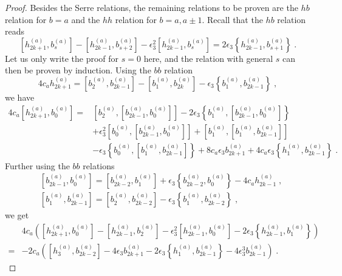 \documentclass[11pt]{article}
\numberwithin{equation}{section}
\numberwithin{figure}{section}
\numberwithin{table}{section}
\begin{document}
\begin{proof}
Besides the Serre relations, the remaining relations to be proven are the $hb$ relation for $b=a$ and the $hh$ relation for $b=a,a\pm1$. Recall that the $hb$ relation reads
\begin{equation}
	\left[h^{(a)}_{2k+1},b^{(a)}_s\right]-\left[h^{(a)}_{2k-1},b^{(a)}_{s+2}\right]-\epsilon_3^2\left[h^{(a)}_{2k-1},b^{(a)}_s\right]=2\epsilon_3\left\{h^{(a)}_{2k-1},b^{(a)}_{s+1}\right\}\;.
\end{equation}
Let us only write the proof for $s=0$ here, and the relation with general $s$ can then be proven by induction. Using the $bb$ relation
\begin{equation}
	4c_ah^{(a)}_{2k+1}=\left[b^{(a)}_2,b^{(a)}_{2k-1}\right]-\left[b^{(a)}_1,b^{(a)}_{2k}\right]-\epsilon_3\left\{b^{(a)}_1,b^{(a)}_{2k-1}\right\}\;,
\end{equation}
we have
\begin{align}
    4c_a\left[h^{(a)}_{2k+1},b^{(a)}_0\right]=&\left[b^{(a)}_2,\left[b^{(a)}_{2k-1},b^{(a)}_0\right]\right]-2\epsilon_3\left\{b^{(a)}_1,\left[b^{(a)}_{2k-1},b^{(a)}_0\right]\right\}\nonumber\\
	&+\epsilon_3^2\left[b^{(a)}_0,\left[b^{(a)}_{2k-1},b^{(a)}_0\right]\right]+\left[b^{(a)}_1,\left[b^{(a)}_1,b^{(a)}_{2k-1}\right]\right]\nonumber\\
	&-\epsilon_3\left\{b^{(a)}_0,\left[b^{(a)}_1,b^{(a)}_{2k-1}\right]\right\}+8c_a\epsilon_3b^{(a)}_{2k+1}+4c_a\epsilon_3\left\{h^{(a)}_1,b^{(a)}_{2k-1}\right\}\;.
\end{align}
Further using the $bb$ relations
\begin{subequations}
	\begin{align}
		&\left[b^{(a)}_{2k-1},b^{(a)}_0\right]=\left[b^{(a)}_{2k-2},b^{(a)}_1\right]+\epsilon_3\left\{b^{(a)}_{2k-2},b^{(a)}_0\right\}-4c_ah^{(a)}_{2k-1}\;,\nonumber\\
		&\left[b^{(a)}_1,b^{(a)}_{2k-1}\right]=\left[b^{(a)}_2,b^{(a)}_{2k-2}\right]-\epsilon_3\left\{b^{(a)}_1,b^{(a)}_{2k-2}\right\}\;,\label{hbhb}
	\end{align}
\end{subequations}
we get
\begin{align}
	&4c_a\left(\left[h^{(a)}_{2k+1},b^{(a)}_0\right]-\left[h^{(a)}_{2k-1},b^{(a)}_2\right]-\epsilon_3^2\left[h^{(a)}_{2k-1},b^{(a)}_0\right]-2\epsilon_3\left\{h^{(a)}_{2k-1},b^{(a)}_1\right\}\right)\nonumber\\
	=&-2c_a\left(\left[h^{(a)}_3,b^{(a)}_{2k-2}\right]-4\epsilon_3b^{(a)}_{2k+1}-2\epsilon_3\left\{h^{(a)}_1,b^{(a)}_{2k-1}\right\}-4\epsilon_3^3b^{(a)}_{2k-1}\right)\;.

\end{align}
\end{proof}
\end{document}
